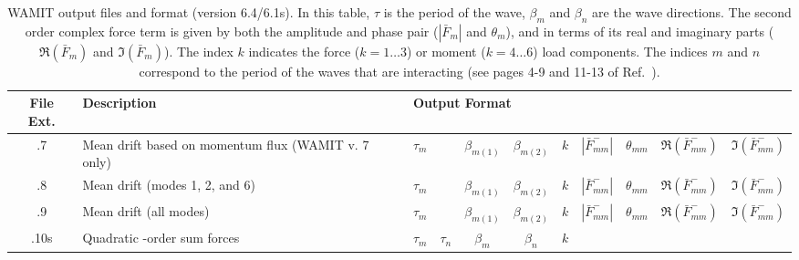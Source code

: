 \newcommand{\pboxl}[1]{\footnotesize{\parbox[c]{1.35in}{#1}}}
\begin{table}
   \centering
   \caption[Format of WAMIT output files]{WAMIT output files and format (version 6.4/6.1s)\cite{WAMIT}. In this table, $\tau$ is the period of the wave, $\beta_m$ and $\beta_n$ are the wave directions.  The second order complex force term is given by both the amplitude and phase pair ($\left|\bar{F}_m\right|$ and  $\theta_m$), and in terms of its real and imaginary parts ($\Re (\bar{F}_m)$ and $\Im (\bar{F}_m)$).  The index $k$ indicates the force ($k=1\ldots3$) or moment ($k=4\ldots6$) load components.  The indices $m$ and $n$ correspond to the period of the waves that are interacting (see pages 4-9 and 11-13 of Ref.~).\label{tab:WamitOutputFormat}}
   \tabcolsep=1.75mm
   \begin{tabular}{c>{\raggedright}p{1.35in}ccccccccc}
      \toprule
 File Ext.  &  Description    &  \multicolumn{9}{l}{Output Format} \\
      \midrule
   .7       &  {\pboxl{Mean drift based on momentum flux (WAMIT v. 7 only)}}
            &  $\tau_m$ &                          &  $\beta_{m(1)}$    &  $\beta_{m(2)}$                &  $k$   
            &  $\left|\bar{F}^{-}_{mm}\right|$     &  $\theta_{mm}$     &  $\Re (\bar{F}^{-}_{mm})$      &  $\Im (\bar{F}^{-}_{mm})$      \\[7pt]
   .8       &  {\pboxl{Mean drift (modes 1, 2, and 6)}}
            &  $\tau_m$ &                          &  $\beta_{m(1)}$    &  $\beta_{m(2)}$                &  $k$   
            &  $\left|\bar{F}^{-}_{mm}\right|$     &  $\theta_{mm}$     &  $\Re (\bar{F}^{-}_{mm})$      &  $\Im (\bar{F}^{-}_{mm})$      \\[5pt]
   .9       &  {\pboxl{Mean drift (all modes)}}
            &  $\tau_m$ &                          &  $\beta_{m(1)}$    &  $\beta_{m(2)}$                &  $k$   
            &  $\left|\bar{F}^{-}_{mm}\right|$     &  $\theta_{mm}$     &  $\Re (\bar{F}^{-}_{mm})$      &  $\Im (\bar{F}^{-}_{mm})$      \\[1pt] \midrule
   .10s     &  {\pboxl{Quadratic -order sum forces}}
            &  $\tau_m$ &  $\tau_n$                &  $\beta_{m}$       &  $\beta_n$                     &  $k$   

\end{tabular}
\end{table}
